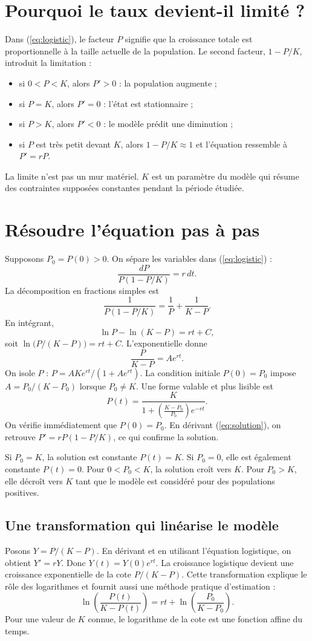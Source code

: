 \section{Pourquoi le taux devient-il limité ?}
Dans (\ref{eq:logistic}), le facteur $P$ signifie que la croissance totale est proportionnelle à la taille actuelle de la population. Le second facteur, $1-P/K$, introduit la limitation :
\begin{itemize}
 \item si $0<P<K$, alors $P'>0$ : la population augmente ;
 \item si $P=K$, alors $P'=0$ : l'état est stationnaire ;
 \item si $P>K$, alors $P'<0$ : le modèle prédit une diminution ;
 \item si $P$ est très petit devant $K$, alors $1-P/K\approx1$ et l'équation ressemble à $P'=rP$.
\end{itemize}
La limite n'est pas un mur matériel. $K$ est un paramètre du modèle qui résume des contraintes supposées constantes pendant la période étudiée.

\section{Résoudre l'équation pas à pas}
Supposons $P_0=P(0)>0$. On sépare les variables dans (\ref{eq:logistic}) :
\[
 \frac{dP}{P(1-P/K)}=r\,dt.
\]
La décomposition en fractions simples est
\[
 \frac{1}{P(1-P/K)}=\frac1P+\frac1{K-P}.
\]
En intégrant,
\[
 \ln P-\ln(K-P)=rt+C,
\]
soit $\ln\bigl(P/(K-P)\bigr)=rt+C$. L'exponentielle donne
\[
 \frac{P}{K-P}=Ae^{rt}.
\]
On isole $P$ : $P=AKe^{rt}/(1+Ae^{rt})$. La condition initiale $P(0)=P_0$ impose $A=P_0/(K-P_0)$ lorsque $P_0\ne K$. Une forme valable et plus lisible est
\begin{equation}\label{eq:solution}
 \boxed{P(t)=\frac{K}{1+\left(\frac{K-P_0}{P_0}\right)e^{-rt}}}.
\end{equation}
On vérifie immédiatement que $P(0)=P_0$. En dérivant (\ref{eq:solution}), on retrouve $P'=rP(1-P/K)$, ce qui confirme la solution.

Si $P_0=K$, la solution est constante $P(t)=K$. Si $P_0=0$, elle est également constante $P(t)=0$. Pour $0<P_0<K$, la solution croît vers $K$. Pour $P_0>K$, elle décroît vers $K$ tant que le modèle est considéré pour des populations positives.

\subsection{Une transformation qui linéarise le modèle}
Posons $Y=P/(K-P)$. En dérivant et en utilisant l'équation logistique, on obtient $Y'=rY$. Donc $Y(t)=Y(0)e^{rt}$. La croissance logistique devient une croissance exponentielle de la cote $P/(K-P)$. Cette transformation explique le rôle des logarithmes et fournit aussi une méthode pratique d'estimation :
\[
 \ln\left(\frac{P(t)}{K-P(t)}\right)=rt+\ln\left(\frac{P_0}{K-P_0}\right).
\]
Pour une valeur de $K$ connue, le logarithme de la cote est une fonction affine du temps.

